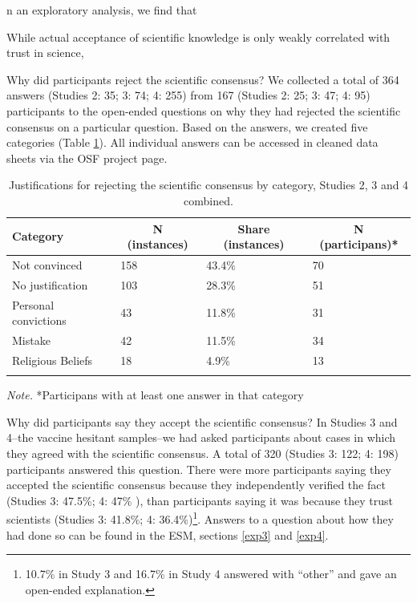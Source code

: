 \documentclass[
  doc,floatsintext]{apa6}
\begin{document}
n an exploratory analysis, we find that

While actual acceptance of scientific knowledge is only weakly correlated with trust in science,

Why did participants reject the scientific consensus? We collected a total of 364 answers (Studies 2: 35; 3: 74; 4: 255) from 167 (Studies 2: 25; 3: 47; 4: 95) participants to the open-ended questions on why they had rejected the scientific consensus on a particular question. Based on the answers, we created five categories (Table \ref{tab:justifications}). All individual answers can be accessed in cleaned data sheets via the OSF project page.

\begin{table}[tbp]

\begin{center}
\begin{threeparttable}

\caption{\label{tab:justifications}Justifications for rejecting the scientific consensus by category, Studies 2, 3 and 4 combined.}

\begin{tabular}{llll}
\toprule
Category & \multicolumn{1}{c}{N (instances)} & \multicolumn{1}{c}{Share (instances)} & \multicolumn{1}{c}{N (participans)*}\\
\midrule
Not convinced & 158 & 43.4\% & 70\\
No justification & 103 & 28.3\% & 51\\
Personal convictions & 43 & 11.8\% & 31\\
Mistake & 42 & 11.5\% & 34\\
Religious Beliefs & 18 & 4.9\% & 13\\
\bottomrule
\addlinespace
\end{tabular}

\begin{tablenotes}[para]
\normalsize{\textit{Note.} *Participans with at least one answer in that category}
\end{tablenotes}

\end{threeparttable}
\end{center}

\end{table}

Why did participants say they accept the scientific consensus? In Studies 3 and 4--the vaccine hesitant samples--we had asked participants about cases in which they agreed with the scientific consensus. A total of 320 (Studies 3: 122; 4: 198) participants answered this question. There were more participants saying they accepted the scientific consensus because they independently verified the fact (Studies 3: 47.5\%; 4: 47\% ), than participants saying it was because they trust scientists (Studies 3: 41.8\%; 4: 36.4\%)\footnote{10.7\% in Study 3 and 16.7\% in Study 4 answered with ``other'' and gave an open-ended explanation.}. Answers to a question about how they had done so can be found in the ESM, sections \ref{exp3} and \ref{exp4}.
\end{document}
